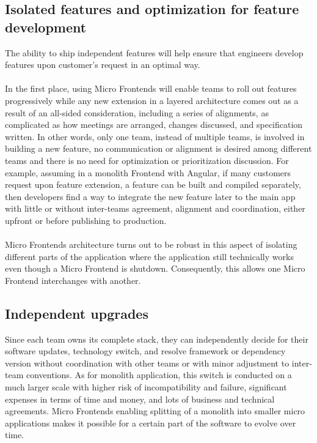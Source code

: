 \documentclass[a4paper]{book}
\begin{document}
\subsection{Isolated features and optimization for feature development} \label{IsolatedFeatures}

The ability to ship independent features will help ensure that engineers develop features upon customer’s request in an optimal way. 
\\ \\
In the first place, using Micro Frontends will enable teams to roll out features progressively while any new extension in a layered architecture comes out as a result of an all-sided consideration, including a series of alignments, as complicated as how meetings are arranged, changes discussed, and specification written. In other words, only one team, instead of multiple teams, is involved in building a new feature, no communication or alignment is desired among different teams and there is no need for optimization or prioritization discussion. For example, assuming in a monolith Frontend with Angular, if many customers request upon feature extension, a feature can be built and compiled separately, then developers find a way to integrate the new feature later to the main app with little or without inter-teams agreement, alignment and coordination, either upfront or before publishing to production.
\\ \\
Micro Frontends architecture turns out to be robust in this aspect of isolating different parts of the application where the application still technically works even though a Micro Frontend is shutdown. Consequently, this allows one Micro Frontend interchanges with another.

\subsection{Independent upgrades}

Since each team owns its complete stack, they can independently decide for their software updates, technology switch, and resolve framework or dependency version without coordination with other teams or with minor adjustment to inter-team conventions. As for monolith application, this switch is conducted on a much larger scale with higher risk of incompatibility and failure, significant expenses in terms of time and money, and lots of business and technical agreements. Micro Frontends enabling splitting of a monolith into smaller micro applications makes it possible for a certain part of the software to evolve over time.
\end{document}
